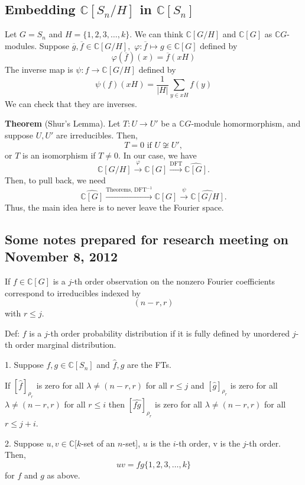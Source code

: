 \documentclass[10pt,reqno]{amsart}
\renewcommand{\phi}{\varphi}
\newcommand{\C}{\mathbb{C}}
\theoremstyle{definition}
\numberwithin{equation}{section}
\begin{document}
\subsection{Embedding $\C[S_n/H]$ in $\C[S_n]$}
Let $G = S_n$ and $H = \{1,2,3,\ldots, k\}.$
We can think $\C[G/H]$ and $\C[G]$
as $\C G$-modules.
Suppose $\overline{g}, \overline{f}\in \C[G/H],$
$\phi:\overline{f}\mapsto g\in \C[G]$ defined by
\[\phi(\overline{f})(x) = \overline{f}(xH)\]
The inverse map is $\psi:f\to \C[G/H]$ defined by
\[\psi(f)(xH) = \frac{1}{|H|}\sum_{y\in xH}f(y)\]
We can check that they are inverses.

\noindent \textbf{Theorem} (Shur's Lemma).
Let $T:U\to U'$ be a $\C G$-module homormorphism,
and suppose $U,U'$ are irreducibles. Then,
\[T=
0 \text{ if } U\not\cong U',
\]
or $T$ is an isomorphism if $T\neq 0.$
In our case, we have
\begin{equation}
\label{map}
\C[G/H]\xrightarrow{\phi}\C[G]\xrightarrow{\text{DFT}}
\widehat{\C[G]}.
\end{equation}
Then, to pull back, we need
\[\widehat{\C[G]}\xrightarrow{\text{Theorems, DFT}^{-1}}\C[G]\xrightarrow{\psi}
\widehat{\C[G/H]}.\]
Thus, the main idea here is to never leave the Fourier
space.

\subsection{Some notes prepared 
for research meeting on November 8, 2012}
If $f\in \C[G]$ is a $j$-th order observation on
the nonzero Fourier coefficients correspond to
irreducibles indexed by 
\[(n-r, r)\]
with $r\leq j.$

Def: $f$ is a $j$-th order probability distribution
if it is fully defined by unordered $j$-th order marginal distribution.

1. Suppose $f, g\in \C[S_n]$ and $\widehat{f}, \widehat{g}$ are the FTs.

If $[\widehat{f}]_{\rho_r}$ is zero for all
$\lambda\neq (n-r, r)$ for all $r\leq j$
and
$[\widehat{g}]_{\rho_r}$ is zero for all
$\lambda\neq (n-r, r)$ for all $r\leq i$
then
$[\widehat{fg}]_{\rho_r}$ is zero for all
$\lambda\neq (n-r, r)$ for all $r\leq j + i$.

2. Suppose $u,v \in \C$[$k$-set of an $n$-set],
$u$ is the $i$-th order, v is the $j$-th order.
Then,
\[uv = fg \{1, 2, 3, \ldots, k\}\]
for $f$ and $g$ as above.
\end{document}
